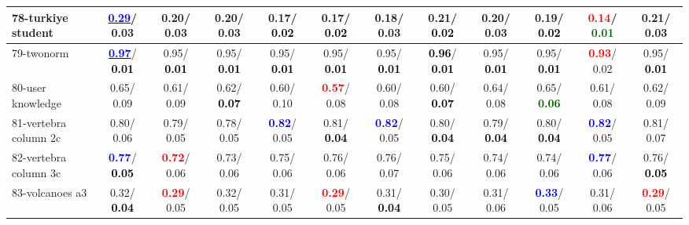 \begin{table}[h]
\begin{center}
{\begin{tabular}{lc|c|c|c|c|c|c|c|c|c|c}
78-turkiye student & \underline{\textcolor{blue}{\textbf{  0.29}}}/  0.03 &   0.20/  0.03 &   0.20/  0.03 &   0.17/\textcolor{black}{\textbf{  0.02}} &   0.17/\textcolor{black}{\textbf{  0.02}} &   0.18/  0.03 &   0.21/\textcolor{black}{\textbf{  0.02}} &   0.20/  0.03 &   0.19/\textcolor{black}{\textbf{  0.02}} & \textcolor{red}{\textbf{  0.14}}/\textcolor{darkgreen}{\textbf{  0.01}} &   0.21/  0.03 \\ \hline
79-twonorm & \underline{\textcolor{blue}{\textbf{  0.97}}}/\textcolor{black}{\textbf{  0.01}} &   0.95/\textcolor{black}{\textbf{  0.01}} &   0.95/\textcolor{black}{\textbf{  0.01}} &   0.95/\textcolor{black}{\textbf{  0.01}} &   0.95/\textcolor{black}{\textbf{  0.01}} &   0.95/\textcolor{black}{\textbf{  0.01}} & \textcolor{black}{\textbf{  0.96}}/\textcolor{black}{\textbf{  0.01}} &   0.95/\textcolor{black}{\textbf{  0.01}} &   0.95/\textcolor{black}{\textbf{  0.01}} & \textcolor{red}{\textbf{  0.93}}/  0.02 &   0.95/\textcolor{black}{\textbf{  0.01}} \\
80-user knowledge &   0.65/  0.09 &   0.61/  0.09 &   0.62/\textcolor{black}{\textbf{  0.07}} &   0.60/  0.10 & \textcolor{red}{\textbf{  0.57}}/  0.08 &   0.60/  0.08 &   0.60/\textcolor{black}{\textbf{  0.07}} &   0.64/  0.08 &   0.65/\textcolor{darkgreen}{\textbf{  0.06}} &   0.61/  0.08 &   0.62/  0.09 \\
81-vertebra column 2c &   0.80/  0.06 &   0.79/  0.05 &   0.78/  0.05 & \textcolor{blue}{\textbf{  0.82}}/  0.05 &   0.81/\textcolor{black}{\textbf{  0.04}} & \textcolor{blue}{\textbf{  0.82}}/  0.05 &   0.80/\textcolor{black}{\textbf{  0.04}} &   0.79/\textcolor{black}{\textbf{  0.04}} &   0.80/\textcolor{black}{\textbf{  0.04}} & \textcolor{blue}{\textbf{  0.82}}/  0.05 &   0.81/  0.07 \\
82-vertebra column 3c & \textcolor{blue}{\textbf{  0.77}}/\textcolor{black}{\textbf{  0.05}} & \textcolor{red}{\textbf{  0.72}}/  0.06 &   0.73/  0.06 &   0.75/  0.06 &   0.76/  0.06 &   0.76/  0.07 &   0.75/  0.06 &   0.74/  0.06 &   0.74/  0.06 & \textcolor{blue}{\textbf{  0.77}}/  0.06 &   0.76/\textcolor{black}{\textbf{  0.05}} \\
83-volcanoes a3 &   0.32/\textcolor{black}{\textbf{  0.04}} & \textcolor{red}{\textbf{  0.29}}/  0.05 &   0.32/  0.05 &   0.31/  0.05 & \textcolor{red}{\textbf{  0.29}}/  0.05 &   0.31/\textcolor{black}{\textbf{  0.04}} &   0.30/  0.05 &   0.31/  0.06 & \textcolor{blue}{\textbf{  0.33}}/  0.05 &   0.31/  0.06 & \textcolor{red}{\textbf{  0.29}}/  0.05 \\

\end{tabular}}
\end{center}
\end{table}
